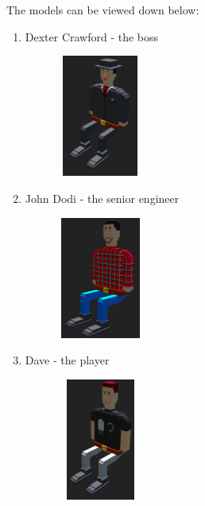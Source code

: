 \documentclass[12pt]{article}
\begin{document}
The models can be viewed down below:

\begin{enumerate}
    \item Dexter Crawford - the boss
          \begin{center}
              \includegraphics[width=5cm, height=4cm]{boss.png}
          \end{center}
    \item John Dodi - the senior engineer
          \begin{center}
              \includegraphics[width=5cm, height=4cm]{john-dodi.png}
          \end{center}
          \pagebreak
    \item Dave - the player
          \begin{center}
              \includegraphics[width=5cm, height=4cm]{player.png}
          \end{center}
\end{enumerate}
\end{document}
